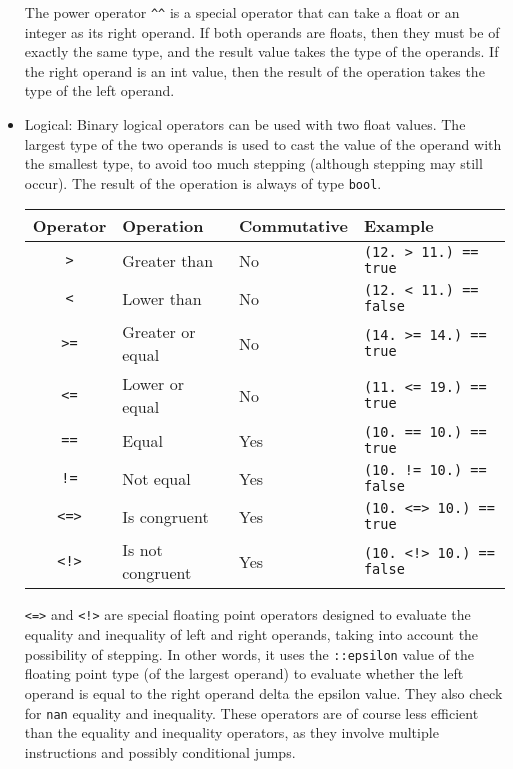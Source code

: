 \begin{itemize}
  The power operator \texttt{\textasciicircum{}\textasciicircum{}} is a special
  operator that can take a float or an integer as its right operand. If both
  operands are floats, then they must be of exactly the same type, and the
  result value takes the type of the operands. If the right operand is an int
  value, then the result of the operation takes the type of the left operand.

\item Logical: Binary logical operators can be used with two float values. The
  largest type of the two operands is used to cast the value of the operand with
  the smallest type, to avoid too much stepping (although stepping may still
  occur). The result of the operation is always of type \texttt{bool}.

  \begin{center}
    \vspace{-20pt}
    \begin{adjustbox}{max width=1.0\linewidth}
      \begin{tabular}{|c|lll|}
        \hline
        Operator & Operation & Commutative & Example\\[0pt]
        \hline
        \hline
        \texttt{>} & Greater than & No & \texttt{(12. > 11.) == true}\\[0pt]
        \texttt{<} & Lower than & No & \texttt{(12. < 11.) == false}\\[0pt]
        \texttt{>=} & Greater or equal & No & \texttt{(14. >= 14.) == true}\\[0pt]
        \texttt{<=} & Lower or equal & No & \texttt{(11. <= 19.) == true}\\[0pt]
        \texttt{==} & Equal & Yes & \texttt{(10. == 10.) == true}\\[0pt]
        \texttt{!=} & Not equal & Yes & \texttt{(10. != 10.) == false}\\[0pt]
        \texttt{<=>} & Is congruent & Yes & \texttt{(10. <=> 10.) == true}\\[0pt]
        \texttt{<!>} & Is not congruent & Yes & \texttt{(10. <!> 10.) == false}\\[0pt]
        \hline
      \end{tabular}
    \end{adjustbox}
  \end{center}

   \texttt{<=>} and \texttt{<!>} are special floating point operators designed
   to evaluate the equality and inequality of left and right operands, taking
   into account the possibility of stepping. In other words, it uses the
   \texttt{::epsilon} value of the floating point type (of the largest operand)
   to evaluate whether the left operand is equal to the right operand delta the
   epsilon value. They also check for \texttt{nan} equality and inequality.
   These operators are of course less efficient than the equality and inequality
   operators, as they involve multiple instructions and possibly conditional
   jumps.


\end{itemize}
